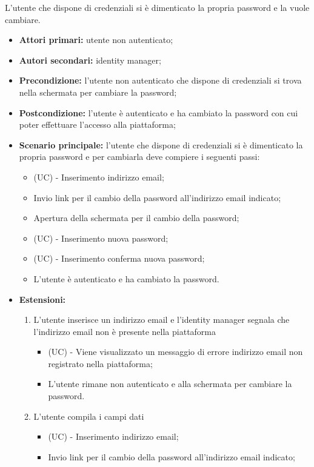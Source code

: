 L'utente che dispone di credenziali si è dimenticato la propria password e la vuole cambiare.
\begin{itemize}
    \item \textbf{Attori primari:} utente non autenticato;
    \item \textbf{Autori secondari:} identity manager;
    \item \textbf{Precondizione:} l'utente non autenticato che dispone di credenziali si trova nella schermata per cambiare la password;
    \item \textbf{Postcondizione:} l'utente è autenticato e ha cambiato la password con cui poter effettuare l'accesso alla piattaforma;
    \item \textbf{Scenario principale:} l'utente che dispone di credenziali si è dimenticato la propria password e per cambiarla deve compiere i seguenti passi:
    \begin{itemize}
        \item (UC) - Inserimento indirizzo email;
        \item Invio link per il cambio della password all'indirizzo email indicato;
        \item Apertura della schermata per il cambio della password;
        \item (UC) - Inserimento nuova password;
        \item (UC) - Inserimento conferma nuova password;
        \item L'utente è autenticato e ha cambiato la password.
    \end{itemize}
	\item \textbf{Estensioni:}
	\begin{enumerate}[label=\lett]
		\item L'utente inserisce un indirizzo email e l'identity manager segnala che l'indirizzo email non è presente nella piattaforma
		\begin{itemize}
			\item (UC) - Viene visualizzato un messaggio di errore indirizzo email non registrato nella piattaforma;
			\item L'utente rimane non autenticato e alla schermata per cambiare la password.
		\end{itemize}
		\item L'utente compila i campi dati
		\begin{itemize}
			\item (UC) - Inserimento indirizzo email;
			\item Invio link per il cambio della password all'indirizzo email indicato;

\end{itemize}
\end{enumerate}
\end{itemize}
